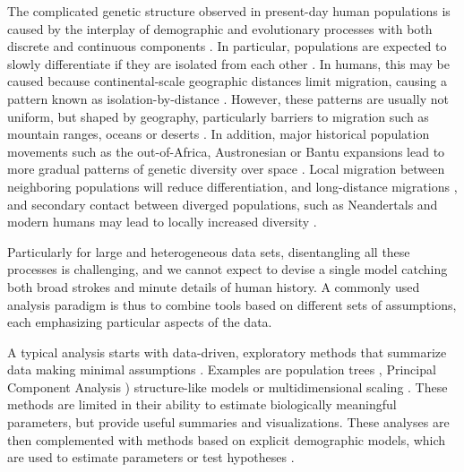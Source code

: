\documentclass[12pt,fullpage, a4paper]{article}
\begin{document}
The complicated genetic structure observed in present-day human populations \citep{the2015, mallick2016} is caused by the interplay of demographic and evolutionary processes with both discrete and continuous components \citep{pritchard2000, rosenberg2002a, serre2004, rosenberg2005, bradburd2018, reich2018a, peter2020a, gopalan2022}.
In particular, populations are expected to slowly differentiate if they are isolated from each other \citep{wahlund1928,cavalli-sforza1975}. In humans, this may be caused because continental-scale geographic distances limit migration, causing a pattern known as isolation-by-distance \citep{slatkin1985}. However, these patterns are usually not uniform, but shaped by geography, particularly barriers  to migration such as mountain ranges, oceans or deserts \citep{cavalli-sforza1994, barbujani1990, rosenberg2005, bradburd2013, peter2020a}. In addition,  major historical population movements such as the out-of-Africa, Austronesian or Bantu expansions lead to more gradual patterns of genetic diversity over space \citep{cavalli-sforza1994, ramachandran2005, novembre2008, stoneking2016, racimo2020}. Local migration between neighboring populations will reduce differentiation, and long-distance migrations \citep{alves2016}, and secondary contact between diverged populations, such as Neandertals and modern humans \citep{green2010} may lead to locally increased diversity \citep{boca2020}.

Particularly for large and heterogeneous data sets, disentangling all these processes is challenging, and we cannot expect to devise a single model catching both broad strokes and minute details of human history. A commonly used analysis paradigm is thus to combine tools based on different sets of assumptions, each emphasizing particular aspects of the data.

A typical analysis starts with data-driven, exploratory methods that summarize data making minimal assumptions \citep[e.g.][]{schraiber2015}. Examples are population trees \citep{cavalli-sforza1967, felsenstein1973, cavalli-sforza1975}, Principal Component Analysis \citep[PCA, ][]{cavalli-sforza1994, patterson2006}) structure-like models \citep{pritchard2000, alexander2009} or multidimensional scaling \citep[MDS][]{lessa1990}. These methods are limited in their ability to estimate biologically meaningful parameters, but provide useful summaries and visualizations. These analyses are then complemented with methods based on explicit demographic models, which are used to estimate parameters or test hypotheses \citep{gutenkunst2009, excoffier2013, kamm2015}. 
\end{document}
